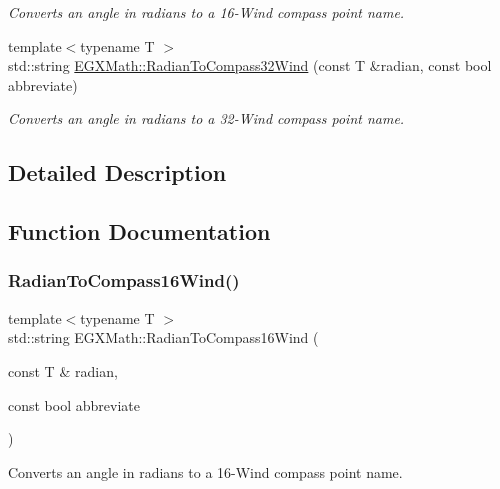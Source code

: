 \begin{DoxyCompactItemize}
\begin{DoxyCompactList}\small\item\em Converts an angle in radians to a 16-\/\+Wind compass point name. \end{DoxyCompactList}\item 
{\footnotesize template$<$typename T $>$ }\\std\+::string \mbox{\hyperlink{group___e_g_x_math-_angle_conversions_ga64587b5f303e1921ab34bc344b5089bb}{E\+G\+X\+Math\+::\+Radian\+To\+Compass32\+Wind}} (const T \&radian, const bool abbreviate)
\begin{DoxyCompactList}\small\item\em Converts an angle in radians to a 32-\/\+Wind compass point name. \end{DoxyCompactList}\end{DoxyCompactItemize}


\subsection{Detailed Description}


\subsection{Function Documentation}
\mbox{\label{group___e_g_x_math-_angle_conversions_gae3be24eac965abfab281c6307fed482a}} 
\subsubsection{\texorpdfstring{Radian\+To\+Compass16\+Wind()}{RadianToCompass16Wind()}}
{\footnotesize\ttfamily template$<$typename T $>$ \\
std\+::string E\+G\+X\+Math\+::\+Radian\+To\+Compass16\+Wind (\begin{DoxyParamCaption}\item[{const T \&}]{radian,  }\item[{const bool}]{abbreviate }\end{DoxyParamCaption})}



Converts an angle in radians to a 16-\/\+Wind compass point name. 


